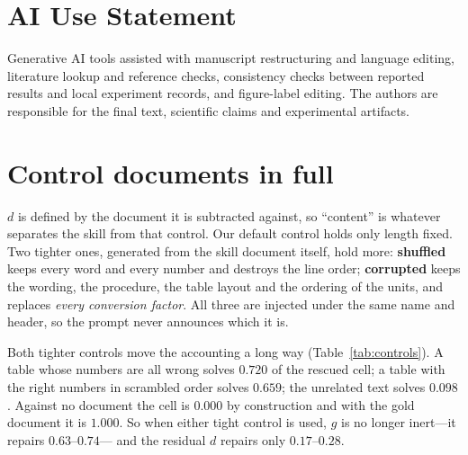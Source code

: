 \documentclass{article}
\newcommand{\dvec}{\ensuremath{d}}
\newcommand{\gvec}{\ensuremath{g}}
\begin{document}
\label{endmain}
\clearpage
\section*{AI Use Statement}
Generative AI tools assisted with manuscript restructuring and language editing,
literature lookup and reference checks, consistency checks between reported
results and local experiment records, and figure-label editing. The authors
are responsible for the final text, scientific claims and experimental artifacts.




\clearpage
\appendix

\section{Control documents in full}
\label{app:controls}

$\dvec$ is defined by the document it is subtracted against, so ``content'' is
whatever separates the skill from that control. Our default control holds only
length fixed. Two tighter ones, generated from the skill document itself, hold
more: \textbf{shuffled} keeps every word and every number and destroys the line
order; \textbf{corrupted} keeps the wording, the procedure, the table layout and
the ordering of the units, and replaces \emph{every conversion factor}. All
three are injected under the same name and header, so the prompt never announces
which it is.

Both tighter controls move the accounting a long way
(Table~\ref{tab:controls}). A table whose numbers are all wrong solves $0.720$
of the rescued cell; a table with the right numbers in scrambled order solves
$0.659$; the unrelated text solves $0.098$. Against no document the cell is
$0.000$ by construction and with the gold document it is $1.000$. So when either
tight control is used, $\gvec$ is no longer inert---it repairs $0.63$--$0.74$---
and the residual $\dvec$ repairs only $0.17$--$0.28$.

\begin{table}[t]
\caption{The same decomposition against three control documents. Synthetic
control, multiple choice, Qwen3-1.7B, $n=358$, rescued cell $n_R=82$, every
one of layers 21--27. ``in context'' is the control document actually placed in the prompt;
``$+\gvec$'' is its state injected at the final position of the no-document
prompt. That the two agree to within $0.03$ for three very different documents
is the strongest validity check we have on the patch itself. $\dvec$ is the
same measurement in all three rows; only what it is subtracted against changes.}
\label{tab:controls}
\centering
\small

\end{table}
\end{document}
